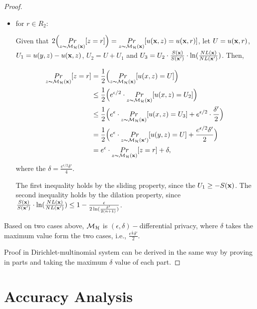 \documentclass{article}
\begin{document}
\begin{proof}
\begin{itemize}
	\item for $r \in R_2$:

	Given that $2\Big( \underset{z \thicksim \mathcal{M}_{\mathcal{H}}(\textbf{x})}{Pr}[z = r]\Big) = \underset{z \thicksim \mathcal{M}_{\mathcal{H}}(\textbf{x})}{Pr}[ u(\textbf{x},z) = u(\textbf{x},r)]$, let $U = u(\textbf{x},r)$, $U_1 = u(y,z) - u(\textbf{x},z)$, $U_2 = U + U_1$ and $U_3 = U_2 \cdot \frac{S(\textbf{x})}{S(\textbf{x}')} \cdot \ln(\frac{NL(\textbf{x})}{NL(\textbf{x}')})$. Then,

	\begin{equation*}
	\begin{split}
	\underset{z \thicksim \mathcal{M}_{\mathcal{H}}(\textbf{x})}{Pr}[ z = r]
	& = 	\frac{1}{2}\Big( \underset{z \thicksim \mathcal{M}_{\mathcal{H}}(\textbf{x})}{Pr}[ u(x,z) = U]\Big)\\
	& \leq 	\frac{1}{2}\Big( e^{\epsilon / 2} \cdot \underset{z \thicksim \mathcal{M}_{\mathcal{H}}(\textbf{x})}{Pr}[ u(x,z) = U_2]\Big)\\
	& \leq 	\frac{1}{2}\Big( e^{\epsilon} \cdot \underset{z \thicksim \mathcal{M}_{\mathcal{H}}(\textbf{x})}{Pr}[ u(x,z) = U_3] + e^{\epsilon/2} \cdot \frac{\delta'}{2}\Big)\\
	& = 	\frac{1}{2}\Big( e^{\epsilon} \cdot \underset{z \thicksim \mathcal{M}_{\mathcal{H}}(\textbf{x}')}{Pr}[ u(y,z) = U] + \frac{e^{\epsilon/2} \delta'}{2}\Big) \\
	& = e^{\epsilon} \cdot \underset{z \thicksim \mathcal{M}_{\mathcal{H}}(\textbf{x})}{Pr}[ z = r] + \delta,
	\end{split}
	\end{equation*}
	where the $\delta = \frac{e^{\epsilon/2} \delta'}{4}$.

	The first inequality holds by the sliding property, since the $U_1 \geq -S(\textbf{x})$. The second inequality holds by the dilation property, since $\frac{S(\textbf{x})}{S(\textbf{x}')} \cdot \ln(\frac{NL(\textbf{x})}{NL(\textbf{x}')}) \leq 1 - \frac{\epsilon}{2 \ln (\frac{\delta'}{2 (n + 1)})}$.
\end{itemize}

Based on two cases above, $\mathcal{M}_{\mathcal{H}}$ is $(\epsilon, \delta)-$differential privacy, where $\delta$ takes the maximum value form the two cases, i.e., $\frac{e^{\frac{\epsilon}{2}} \delta'}{2}$.

Proof in Dirichlet-multinomial system can be derived in the same way by proving in parts and taking the maximum $\delta$ value of each part. 
\end{proof}

\section{Accuracy Analysis}
\end{document}
